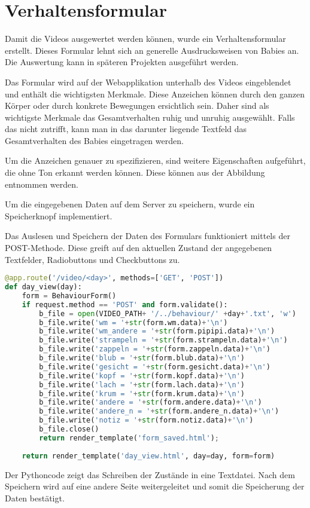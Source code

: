 \section{Verhaltensformular}
\label{sec:verhaltensformular}

Damit die Videos ausgewertet werden können, wurde ein Verhaltensformular erstellt. Dieses Formular lehnt sich an generelle Ausdrucksweisen von Babies an.
Die Auswertung kann in späteren Projekten ausgeführt werden.

Das Formular wird auf der Webapplikation unterhalb des Videos eingeblendet und enthält die wichtigsten Merkmale. Diese Anzeichen können durch den ganzen Körper oder durch konkrete Bewegungen ersichtlich sein. Daher sind als \dq wichtigste Merkmale \dq das Gesamtverhalten \dq ruhig \dq und \dq unruhig \dq ausgewählt. Falls das nicht zutrifft, kann man in das darunter liegende Textfeld das Gesamtverhalten des Babies eingetragen werden.




Um die Anzeichen genauer zu spezifizieren, sind weitere Eigenschaften aufgeführt, die ohne Ton erkannt werden können. Diese können aus der Abbildung entnommen werden.


Um die eingegebenen Daten auf dem Server zu speichern, wurde ein Speicherknopf implementiert.


Das Auslesen und Speichern der Daten des Formulars funktioniert mittels der POST-Methode. Diese greift auf den aktuellen Zustand der angegebenen Textfelder, Radiobuttons und Checkbuttons zu.

\begin{lstlisting}[language=Python, caption=webapp: verhaltensformular]
@app.route('/video/<day>', methods=['GET', 'POST'])
def day_view(day):	
	form = BehaviourForm()
	if request.method == 'POST' and form.validate():
		b_file = open(VIDEO_PATH+ '/../behaviour/' +day+'.txt', 'w')
		b_file.write('wm = '+str(form.wm.data)+'\n')
		b_file.write('wm_andere = '+str(form.pipipi.data)+'\n')
		b_file.write('strampeln = '+str(form.strampeln.data)+'\n')
		b_file.write('zappeln = '+str(form.zappeln.data)+'\n')
		b_file.write('blub = '+str(form.blub.data)+'\n')
		b_file.write('gesicht = '+str(form.gesicht.data)+'\n')
		b_file.write('kopf = '+str(form.kopf.data)+'\n')
		b_file.write('lach = '+str(form.lach.data)+'\n')
		b_file.write('krum = '+str(form.krum.data)+'\n')
		b_file.write('andere = '+str(form.andere.data)+'\n')
		b_file.write('andere_n = '+str(form.andere_n.data)+'\n')
		b_file.write('notiz = '+str(form.notiz.data)+'\n')
		b_file.close()
		return render_template('form_saved.html');
		
	return render_template('day_view.html', day=day, form=form)
\end{lstlisting}

Der Pythoncode zeigt das Schreiben der Zustände in eine Textdatei. Nach dem Speichern wird auf eine andere Seite weitergeleitet und somit die Speicherung der Daten bestätigt.
